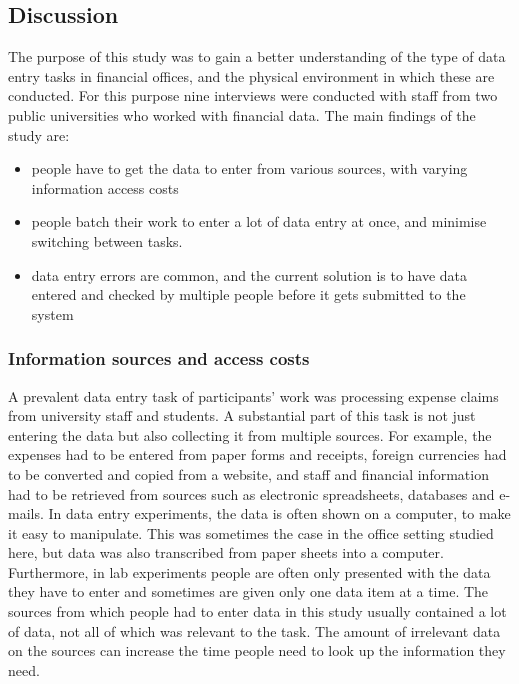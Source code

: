 \pagebreak

\subsection{Discussion}
The purpose of this study was to gain a better understanding of the type of data entry tasks in financial offices, and the physical environment in which these are conducted. For this purpose nine interviews were conducted with staff from two public universities who worked with financial data. The main findings of the study are: 

\begin{itemize}
\item 
people have to get the data to enter from various sources, with varying information access costs
\item 
people batch their work to enter a lot of data entry at once, and minimise switching between tasks. 
\item 
data entry errors are common, and the current solution is to have data entered and checked by multiple people before it gets submitted to the system
\end{itemize}

\subsubsection{Information sources and access costs}
A prevalent data entry task of participants' work was processing expense claims from university staff and students. A substantial part of this task is not just entering the data but also collecting it from multiple sources. For example, the expenses had to be entered from paper forms and receipts, foreign currencies had to be converted and copied from a website, and staff and financial information had to be retrieved from sources such as electronic spreadsheets, databases and e-mails. 
In data entry experiments, the data is often shown on a computer, to make it easy to manipulate. This was sometimes the case in the office setting studied here, but data was also transcribed from paper sheets into a computer. Furthermore, in lab experiments people are often only presented with the data they have to enter and sometimes are given only one data item at a time. The sources from which people had to enter data in this study usually contained a lot of data, not all of which was relevant to the task. The amount of irrelevant data on the sources can increase the time people need to look up the information they need.


